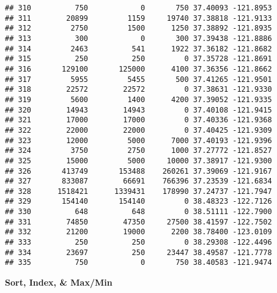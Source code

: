 \documentclass[
]{book}
\newenvironment{Shaded}{\begin{snugshade}}{\end{snugshade}}
\newcommand{\KeywordTok}[1]{\textcolor[rgb]{0.13,0.29,0.53}{\textbf{#1}}}
\newcommand{\NormalTok}[1]{#1}
\newcommand{\OperatorTok}[1]{\textcolor[rgb]{0.81,0.36,0.00}{\textbf{#1}}}
\newcommand{\StringTok}[1]{\textcolor[rgb]{0.31,0.60,0.02}{#1}}
\begin{document}
\begin{verbatim}
## 310          750            0       750 37.40093 -121.8953
## 311        20899         1159     19740 37.38818 -121.9133
## 312         2750         1500      1250 37.38892 -121.8935
## 313          300            0       300 37.39438 -121.8886
## 314         2463          541      1922 37.36182 -121.8682
## 315          250          250         0 37.35728 -121.8691
## 316       129100       125000      4100 37.36356 -121.8662
## 317         5955         5455       500 37.41265 -121.9501
## 318        22572        22572         0 37.38631 -121.9330
## 319         5600         1400      4200 37.39052 -121.9335
## 320        14943        14943         0 37.40108 -121.9415
## 321        17000        17000         0 37.40336 -121.9368
## 322        22000        22000         0 37.40425 -121.9309
## 323        12000         5000      7000 37.40193 -121.9396
## 324         3750         2750      1000 37.27772 -121.8527
## 325        15000         5000     10000 37.38917 -121.9300
## 326       413749       153488    260261 37.39069 -121.9167
## 327       833087        66691    766396 37.23539 -121.6834
## 328      1518421      1339431    178990 37.24737 -121.7947
## 329       154140       154140         0 38.48323 -122.7126
## 330          648          648         0 38.51111 -122.7900
## 331        74850        47350     27500 38.41597 -122.7502
## 332        21200        19000      2200 38.78400 -123.0109
## 333          250          250         0 38.29308 -122.4496
## 334        23697          250     23447 38.49587 -121.7778
## 335          750            0       750 38.40583 -121.9474
\end{verbatim}

\textbf{Sort, Index, \& Max/Min}

\begin{Shaded}
\end{Shaded}
\end{document}

